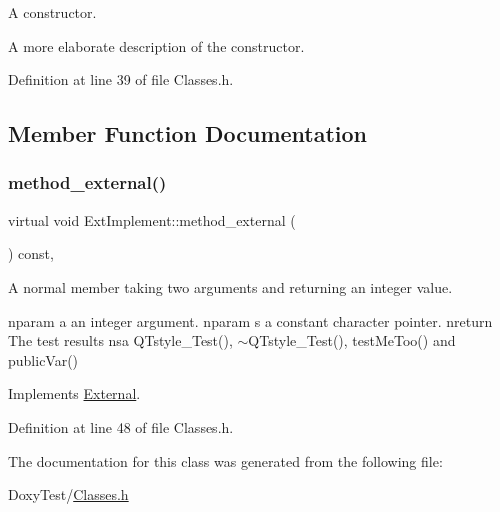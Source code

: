 A constructor. 

A more elaborate description of the constructor. 

Definition at line 39 of file Classes.\+h.



\subsection{Member Function Documentation}
\mbox{\label{class_ext_implement_a5f41afb83e49e92542b031aecfd097a9}} 
\subsubsection{\texorpdfstring{method\+\_\+external()}{method\_external()}}
{\footnotesize\ttfamily virtual void Ext\+Implement\+::method\+\_\+external (\begin{DoxyParamCaption}{ }\end{DoxyParamCaption}) const\hspace{0.3cm}{\ttfamily [inline]}, {\ttfamily [virtual]}}



A normal member taking two arguments and returning an integer value. 

nparam a an integer argument. nparam s a constant character pointer. nreturn The test results nsa Q\+Tstyle\+\_\+\+Test(), $\sim$\+Q\+Tstyle\+\_\+\+Test(), test\+Me\+Too() and public\+Var() 

Implements \hyperlink{class_external_a6bda85aa1f6f1396469261bd13d39e72}{External}.



Definition at line 48 of file Classes.\+h.



The documentation for this class was generated from the following file\+:\begin{DoxyCompactItemize}
\item 
Doxy\+Test/\hyperlink{_classes_8h}{Classes.\+h}\end{DoxyCompactItemize}
